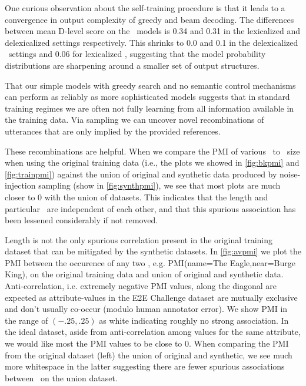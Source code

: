 



%

One curious observation about the self-training procedure is that 
it leads to a convergence in output complexity of greedy and beam decoding.
The differences between mean D-level score on the \basegen~models is
0.34 and 0.31 in the lexicalized and delexicalized settings respectively.
This shrinks to 0.0 and 0.1 in the delexicalized \auggen~settings and 0.06 
for lexicalized \auggen, suggesting that the model probability distributions
are sharpening around a smaller set of output structures.

That our simple models with greedy search and no semantic control mechanisms
can perform as reliably as more sophisticated models suggests that 
in standard training regimes we 
are often not fully learning from all information available in the 
training data. Via sampling we can uncover novel recombinations of 
utterances that are only implied by the provided references. 



These recombinations are helpful. When we compare the PMI of various \attributevalues~to
\meaningrepresentation~size when using the original training data (i.e., the
plots we showed in \autoref{fig:bkpmi} and \autoref{fig:trainpmi}) against the union of original and
synthetic data produced by noise-injection sampling (show in \autoref{fig:synthpmi}), we see that
most plots are much closer to 0 with the union of datasets. This indicates
that the length and particular \attributevalues~are independent of each other,
and that this spurious association has been lessened considerably 
if not removed.



Length is not the only spurious correlation present in the original
training dataset that can be mitigated by the synthetic datasets. In \autoref{fig:avpmi} we plot the PMI between the occurence of any two \attributevalues,
e.g. PMI(name=The Eagle,near=Burge King), on
the original training data and union of original and synthetic data. 
Anti-correlation, i.e. extremely negative PMI values, along the diagonal
are expected as attribute-values in the E2E Challenge dataset are mutually
exclusive and don't usually co-occur (modulo human annotator error). 
We show PMI in the range of $(-.25, .25)$ as white indicating roughly no
strong association. In the ideal dataset, aside from anti-correlation
among values for the same attribute, we would like most the PMI values to be
close to 0. When comparing the PMI from the original dataset (left) 
the union of original and synthetic, we see much more whitespace in the latter
suggesting there are fewer spurious associations between \attributevalues~on the union dataset.



